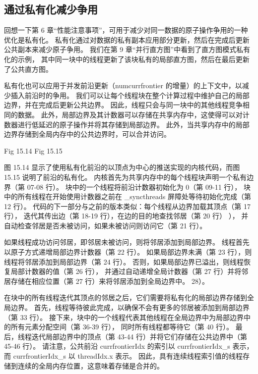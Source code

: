 \subsection{通过私有化减少争用}
回想一下第 6 章“性能注意事项”，可用于减少对同一数据的原子操作争用的一种优化是私有化。 
私有化通过对数据的私有副本应用部分更新，然后在完成后更新公共副本来减少原子争用。 
我们在第 9 章“并行直方图”中看到了直方图模式私有化的示例，
其中同一块中的线程更新了该块私有的局部直方图，然后在最后更新了公共直方图。

私有化也可以应用于并发前沿更新（numcurrfrontier 的增量）的上下文中，以减少插入前沿时的争用。 
我们可以让每个线程块在整个计算过程中维护自己的局部边界，并在完成后更新公共边界。 
因此，线程只会与同一块中的其他线程竞争相同的数据。 
此外，局部边界及其计数器可以存储在共享内存中，这使得可以对计数器进行低延迟的原子操作并将其存储到局部边界。 
此外，当共享内存中的局部边界存储到全局内存中的公共边界时，可以合并访问。

{\color{red} Fig 15.14}
{\color{red} Fig 15.15}

图 15.14 显示了使用私有化前沿的以顶点为中心的推送实现的内核代码，而图 15.15 说明了前沿的私有化。 
内核首先为共享内存中的每个线程块声明一个私有边界（第 07-08 行）。 
块中的一个线程将前沿计数器初始化为 0（第 09-11 行），
块中的所有线程在开始使用计数器之前在 \_syncthreads 屏障处等待初始化完成（第 12 行）。 
代码的下一部分与之前的版本类似：每个线程从边界加载其顶点（第 17 行），
迭代其传出边（第 18-19 行），在边的目的地查找邻居（第 20 行） ），
并自动检查邻居是否未被访问，如果未被访问则访问它（第 21 行）。

如果线程成功访问邻居，即邻居未被访问，则将邻居添加到局部边界。 线程首先以原子方式递增局部边界计数器（第 22 行）。 
如果局部边界未满（第 23 行），则线程将邻居添加到局部边界（第 24 行）。 
否则，如果局部边界已溢出，则线程恢复局部计数器的值（第 26 行），
并通过自动递增全局计数器（第 27 行）并将邻居存储在相应位置（第 27 行）来将邻居添加到全局边界中。 28）。

在块中的所有线程迭代其顶点的邻居之后，它们需要将私有化的局部边界存储到全局边界。 
首先，线程等待彼此完成，以确保不会有更多的邻居被添加到局部边界（第 33 行）。 
接下来，块中的一个线程代表其他线程在全局边界中为局部边界中的所有元素分配空间（第 36-39 行），
同时所有线程都等待它（第 40 行）。 
最后，线程迭代局部边界中的顶点（第 43-44 行）并将它们存储在公共边界中（第 45-46 行）。 
请注意，公共前沿 currfrontierIdx 的索引以 currfrontierIdx\_s 表示，而 currfrontierIdx\_s 以 threadIdx.x 表示。 
因此，具有连续线程索引值的线程存储到连续的全局内存位置，这意味着存储是合并的。

